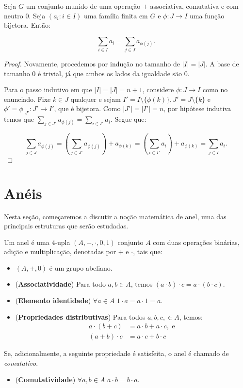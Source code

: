 \begin{prop}
    Seja $G$ um conjunto munido de uma operação $+$ associativa, comutativa e com neutro $0$. Seja $(a_i: i \in I)$ uma família finita em $G$ e $\phi:J\rightarrow I$ uma função bijetora. Então:

    $$\sum_{i \in I}a_i=\sum_{j \in J}a_{\phi(j)}.$$

\end{prop}
\begin{proof}
Novamente, procedemos por indução no tamanho de $|I|=|J|$. A base de tamanho $0$ é trivial, já que ambos os lados da igualdade são $0$.

Para o passo indutivo em que $|I|=|J|=n+1$, considere $\phi:J\rightarrow I$ como no enunciado. Fixe $k \in J$ qualquer e sejam $I'=I\setminus\{\phi(k)\}, J'=J\setminus\{k\}$ e $\phi'=\phi|_{J'}:J'\rightarrow I'$, que é bijetora. Como $|J'|=|I'|=n$, por hipótese indutiva temos que $\sum_{j \in J'}a_{\phi(j)}=\sum_{i \in I'}a_i$. Segue que:

$$\sum_{j \in J}a_{\phi(j)}=\left(\sum_{j \in J'}a_{\phi(j)}\right)+a_{\phi(k)}=\left(\sum_{i \in I'}a_{i}\right)+a_{\phi(k)}=\sum_{j \in I}a_{i}.$$
\end{proof}

\section{Anéis}
Nesta seção, começaremos a discutir a noção matemática de anel, uma das principais estruturas que serão estudadas.
\begin{definition}[Anel]
    Um anel é uma $4$-upla $(A, +, \cdot, 0, 1)$ conjunto $A$ com duas operações binárias, adição e multiplicação, denotadas por $+$ e $\cdot$, tais que:
    \begin{itemize}
        \item $(A, +, 0)$ é um grupo abeliano.
        \item (\textbf{Associatividade}) Para todo $a, b \in A$, temos $(a \cdot b)\cdot c = a\cdot(b\cdot c)$.
        \item (\textbf{Elemento identidade}) $\forall a \in A$ $1 \cdot a = a \cdot 1 = a$.
        \item (\textbf{Propriedades distributivas}) Para todos $a, b, c, \in A$, temos:
        \begin{align*}
            a \cdot (b + c) &= a \cdot b + a \cdot c, \text{ e}\\
            (a + b) \cdot c &= a \cdot c + b \cdot c
        \end{align*}
    \end{itemize}
    Se, adicionalmente, a seguinte propriedade é satisfeita, o anel é chamado de \emph{comutativo}.
    \begin{itemize}
        \item (\textbf{Comutatividade}) $\forall a, b \in A$ $a \cdot b = b \cdot a$.
    \end{itemize}
\end{definition}

